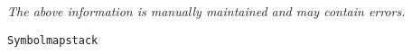 \label{pkg:symbolmapstack}

{\tiny \it The above information is manually maintained and may contain errors.}
\begin{verbatim}
Symbolmapstack
\end{verbatim}
